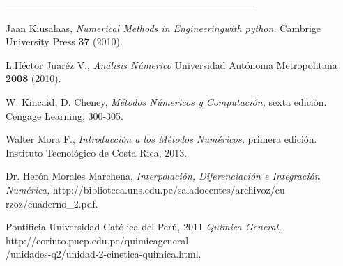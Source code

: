 \documentclass[10pt,a4paper]{article}
\begin{document}
\begin{center}
 -----------------------------------------------------------------------------
\end{center}
\begin{multicols}{2}
\begin{list}{}{\setlength{\topsep}{0mm}\setlength{\itemsep}{0mm}%
\setlength{\parsep}{0mm}\setlength{\leftmargin}{4mm}}
%
\small
\item[1.] Jaan Kiusalaas, \textit{Numerical Methods in Engineering\linebreak with python.} Cambrige University Press \textbf{37} (2010).
\item[2.] L.Héctor Juaréz V., \textit{Análisis Númerico} Universidad Autónoma Metropolitana \textbf{2008} (2010).
\item[3.] W. Kincaid, D. Cheney, \textit{Métodos Númericos y Computación,} sexta edición. Cengage Learning, 300-305.

\item[4.] Walter Mora F.,
\textit{Introducción a los Métodos Numéricos,} primera edición. Instituto Tecnológico de Costa Rica, 2013.

\item[5.] Dr. Herón Morales Marchena,
\textit{Interpolación, Diferenciación e Integración Numérica,} http://biblioteca.uns.edu.pe/saladocentes/archivoz/cu\\rzoz/cuaderno\_2.pdf.

\item[6.] Pontificia Universidad Católica del Perú, 2011
\textit{Química General,} http://corinto.pucp.edu.pe/quimicageneral\\/unidades-q2/unidad-2-cinetica-quimica.html.
%
\end{list}
\end{multicols}
\end{document}
